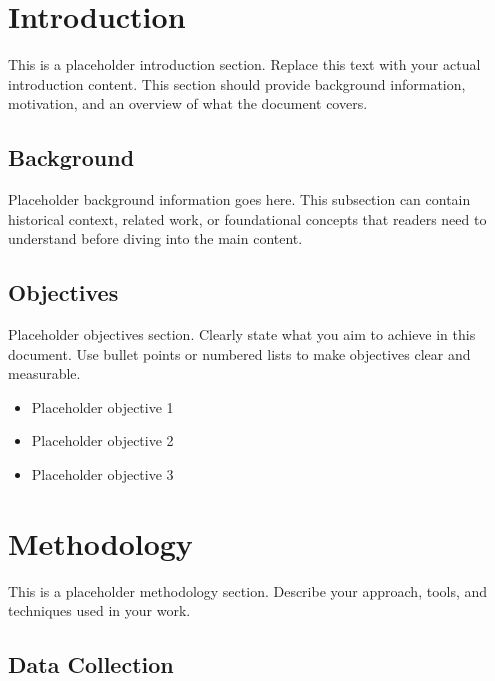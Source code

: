 \tableofcontents
\newpage


\section{Introduction}\label{sec:introduction}

This is a placeholder introduction section. Replace this text with your actual introduction content. This section should provide background information, motivation, and an overview of what the document covers.

\subsection{Background}\label{subsec:background}

Placeholder background information goes here. This subsection can contain historical context, related work, or foundational concepts that readers need to understand before diving into the main content.

\subsection{Objectives}\label{subsec:objectives}

Placeholder objectives section. Clearly state what you aim to achieve in this document. Use bullet points or numbered lists to make objectives clear and measurable.

\begin{itemize}
\item Placeholder objective 1
\item Placeholder objective 2
\item Placeholder objective 3
\end{itemize}

\section{Methodology}\label{sec:methodology}

This is a placeholder methodology section. Describe your approach, tools, and techniques used in your work.

\subsection{Data Collection}\label{subsec:data-collection}

